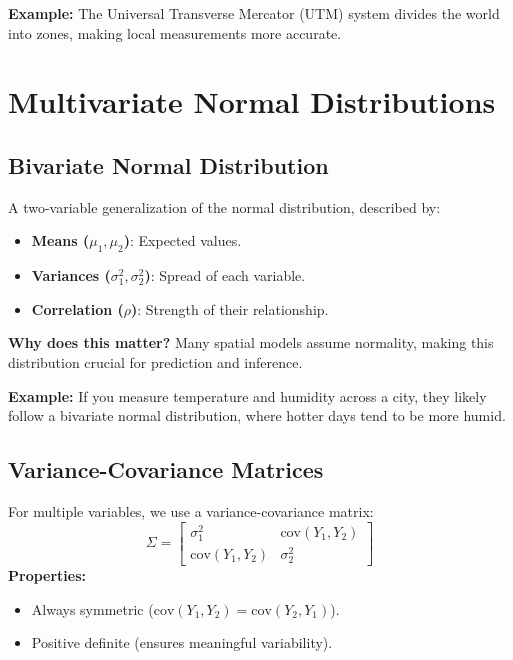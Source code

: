 \documentclass[
  11pt,
]{report}
\providecommand{\tightlist}{%
  \setlength{\itemsep}{0pt}\setlength{\parskip}{0pt}}\usepackage{longtable,booktabs,array}
\begin{document}
\textbf{Example:} The Universal Transverse Mercator (UTM) system divides
the world into zones, making local measurements more accurate.

\chapter{Multivariate Normal
Distributions}\label{multivariate-normal-distributions}

\section{Bivariate Normal
Distribution}\label{bivariate-normal-distribution}

A two-variable generalization of the normal distribution, described by:

\begin{itemize}
\tightlist
\item
  \textbf{Means (\(\mu_1, \mu_2\))}: Expected values.
\item
  \textbf{Variances (\(\sigma_1^2, \sigma_2^2\))}: Spread of each
  variable.
\item
  \textbf{Correlation (\(\rho\))}: Strength of their relationship.
\end{itemize}

\textbf{Why does this matter?} Many spatial models assume normality,
making this distribution crucial for prediction and inference.

\textbf{Example:} If you measure temperature and humidity across a city,
they likely follow a bivariate normal distribution, where hotter days
tend to be more humid.

\section{Variance-Covariance
Matrices}\label{variance-covariance-matrices}

For multiple variables, we use a variance-covariance matrix: \[
\Sigma = \begin{bmatrix} \sigma_1^2 & \text{cov}(Y_1, Y_2) \\ \text{cov}(Y_1, Y_2) & \sigma_2^2 \end{bmatrix}
\] \textbf{Properties:}

\begin{itemize}
\tightlist
\item
  Always symmetric (\(\text{cov}(Y_1, Y_2) = \text{cov}(Y_2, Y_1)\)).
\item
  Positive definite (ensures meaningful variability).
\end{itemize}
\end{document}
